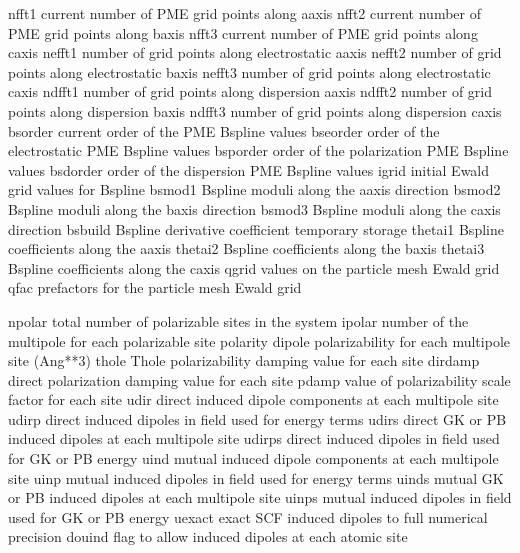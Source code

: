 \documentclass[letterpaper,11pt,english]{sphinxmanual}
\begin{document}
\begin{sphinxVerbatim}[commandchars=\\\{\}]
nfft1           current number of PME grid points along a\PYGZhy{}axis
nfft2           current number of PME grid points along b\PYGZhy{}axis
nfft3           current number of PME grid points along c\PYGZhy{}axis
nefft1          number of grid points along electrostatic a\PYGZhy{}axis
nefft2          number of grid points along electrostatic b\PYGZhy{}axis
nefft3          number of grid points along electrostatic c\PYGZhy{}axis
ndfft1          number of grid points along dispersion a\PYGZhy{}axis
ndfft2          number of grid points along dispersion b\PYGZhy{}axis
ndfft3          number of grid points along dispersion c\PYGZhy{}axis
bsorder         current order of the PME B\PYGZhy{}spline values
bseorder        order of the electrostatic PME B\PYGZhy{}spline values
bsporder        order of the polarization PME B\PYGZhy{}spline values
bsdorder        order of the dispersion PME B\PYGZhy{}spline values
igrid           initial Ewald grid values for B\PYGZhy{}spline
bsmod1          B\PYGZhy{}spline moduli along the a\PYGZhy{}axis direction
bsmod2          B\PYGZhy{}spline moduli along the b\PYGZhy{}axis direction
bsmod3          B\PYGZhy{}spline moduli along the c\PYGZhy{}axis direction
bsbuild         B\PYGZhy{}spline derivative coefficient temporary storage
thetai1         B\PYGZhy{}spline coefficients along the a\PYGZhy{}axis
thetai2         B\PYGZhy{}spline coefficients along the b\PYGZhy{}axis
thetai3         B\PYGZhy{}spline coefficients along the c\PYGZhy{}axis
qgrid           values on the particle mesh Ewald grid
qfac            prefactors for the particle mesh Ewald grid
\end{sphinxVerbatim}


\begin{sphinxVerbatim}[commandchars=\\\{\}]
npolar          total number of polarizable sites in the system
ipolar          number of the multipole for each polarizable site
polarity        dipole polarizability for each multipole site (Ang**3)
thole           Thole polarizability damping value for each site
dirdamp         direct polarization damping value for each site
pdamp           value of polarizability scale factor for each site
udir            direct induced dipole components at each multipole site
udirp           direct induced dipoles in field used for energy terms
udirs           direct GK or PB induced dipoles at each multipole site
udirps          direct induced dipoles in field used for GK or PB energy
uind            mutual induced dipole components at each multipole site
uinp            mutual induced dipoles in field used for energy terms
uinds           mutual GK or PB induced dipoles at each multipole site
uinps           mutual induced dipoles in field used for GK or PB energy
uexact          exact SCF induced dipoles to full numerical precision
douind          flag to allow induced dipoles at each atomic site
\end{sphinxVerbatim}
\end{document}
